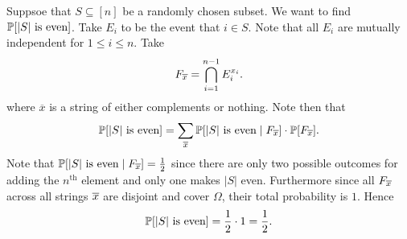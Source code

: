 \documentclass{subfiles}
\begin{document}
\begin{example}
    Suppsoe that $S \subseteq [n]$ be a randomly chosen subset. We want to find $\mathbb{P}\qty[|S| \text{ is even}]$. Take $E_i$ to be the event that $i \in S$. Note that all $E_i$ are mutually independent for $1 \leq i \leq n$. Take
    \[
        F_{\overline{x}} = \bigcap_{i=1}^{n-1} E_i^{x_i}
    .\]
    where $\overline{x}$ is a string of either complements or nothing. Note then that
    \[
        \mathbb{P}\qty[|S| \text{ is even}] = \sum_{\overline{x}} \mathbb{P}\qty[|S| \text{ is even} \mid F_{\overline{x}}] \cdot \mathbb{P}\qty[F_{\overline{x}}]
    .\]
    Note that $\mathbb{P}\qty[|S| \text{ is even} \mid F_{\overline{x}}] = \frac{1}{2}$ since there are only two possible outcomes for adding the $n^\text{th}$ element and only one makes $|S|$ even. Furthermore since all $F_{\overline{x}}$ across all strings $\overline{x}$ are disjoint and cover $\Omega$, their total probability is $1$. Hence
    \[
        \mathbb{P}\qty[|S| \text{ is even}] = \frac{1}{2} \cdot 1 = \frac{1}{2}
    .\]
\end{example}
\end{document}

